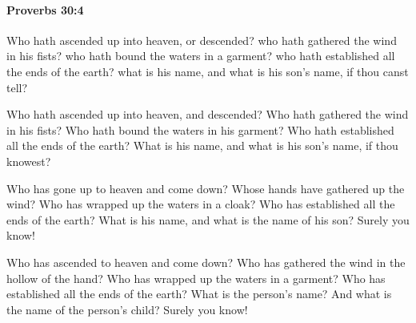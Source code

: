 		\paragraph{Proverbs 30:4} %
			\label{PROVERBS-30-4}

			Who hath ascended up into heaven, or descended? who hath gathered the wind in his fists? who hath bound the waters in a garment? who hath established all the ends of the earth? what is his name, and what is his son’s name, if thou canst tell?

			\begin{versebox}
					\item[BHS] 
					\item[ASV] Who hath ascended up into heaven, and descended? Who hath gathered the wind in his fists? Who hath bound the waters in his garment? Who hath established all the ends of the earth? What is his name, and what is his son's name, if thou knowest?
					\item[NIV] Who has gone up to heaven and come down? Whose hands have gathered up the wind? Who has wrapped up the waters in a cloak? Who has established all the ends of the earth? What is his name, and what is the name of his son? Surely you know!
					\item[NRSV] Who has ascended to heaven and come down? Who has gathered the wind in the hollow of the hand? Who has wrapped up the waters in a garment? Who has established all the ends of the earth? What is the person’s name? And what is the name of the person’s child? Surely you know!
			\end{versebox}

